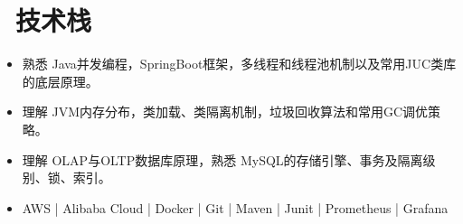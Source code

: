 \documentclass{resume}
\begin{document}


\section{\faCogs\ 技术栈}
\begin{itemize}[parsep=0.5ex]
  \item 熟悉 Java并发编程，SpringBoot框架，多线程和线程池机制以及常用JUC类库的底层原理。
  \item 理解 JVM内存分布，类加载、类隔离机制，垃圾回收算法和常用GC调优策略。
  \item 理解 OLAP与OLTP数据库原理，熟悉 MySQL的存储引擎、事务及隔离级别、锁、索引。
  \item AWS | Alibaba Cloud | Docker | Git | Maven | Junit | Prometheus | Grafana
\end{itemize}

%
%
\end{document}
